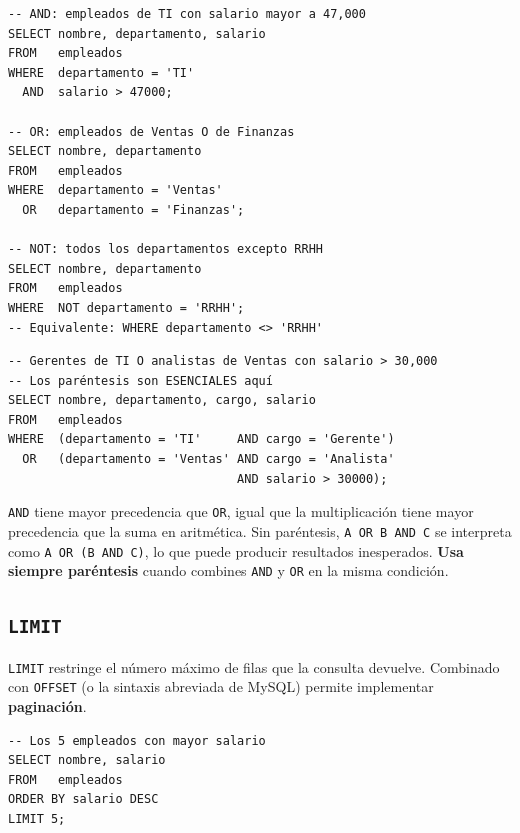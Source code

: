 \begin{lstlisting}[caption={Uso de AND, OR y NOT.}]
-- AND: empleados de TI con salario mayor a 47,000
SELECT nombre, departamento, salario
FROM   empleados
WHERE  departamento = 'TI'
  AND  salario > 47000;

-- OR: empleados de Ventas O de Finanzas
SELECT nombre, departamento
FROM   empleados
WHERE  departamento = 'Ventas'
  OR   departamento = 'Finanzas';

-- NOT: todos los departamentos excepto RRHH
SELECT nombre, departamento
FROM   empleados
WHERE  NOT departamento = 'RRHH';
-- Equivalente: WHERE departamento <> 'RRHH'
\end{lstlisting}

\begin{lstlisting}[caption={Combinación de operadores y uso de paréntesis.}]
-- Gerentes de TI O analistas de Ventas con salario > 30,000
-- Los paréntesis son ESENCIALES aquí
SELECT nombre, departamento, cargo, salario
FROM   empleados
WHERE  (departamento = 'TI'     AND cargo = 'Gerente')
  OR   (departamento = 'Ventas' AND cargo = 'Analista'
                                AND salario > 30000);
\end{lstlisting}

\begin{nota}
\texttt{AND} tiene mayor precedencia que \texttt{OR}, igual que la
multiplicación tiene mayor precedencia que la suma en aritmética.
Sin paréntesis, \texttt{A OR B AND C} se interpreta como
\texttt{A OR (B AND C)}, lo que puede producir resultados
inesperados.
\textbf{Usa siempre paréntesis} cuando combines \texttt{AND} y
\texttt{OR} en la misma condición.
\end{nota}

\subsection{\texttt{LIMIT}}

\texttt{LIMIT} restringe el número máximo de filas que la consulta
devuelve.
Combinado con \texttt{OFFSET} (o la sintaxis abreviada de MySQL)
permite implementar \textbf{paginación}.

\begin{lstlisting}[caption={LIMIT básico.}]
-- Los 5 empleados con mayor salario
SELECT nombre, salario
FROM   empleados
ORDER BY salario DESC
LIMIT 5;
\end{lstlisting}

